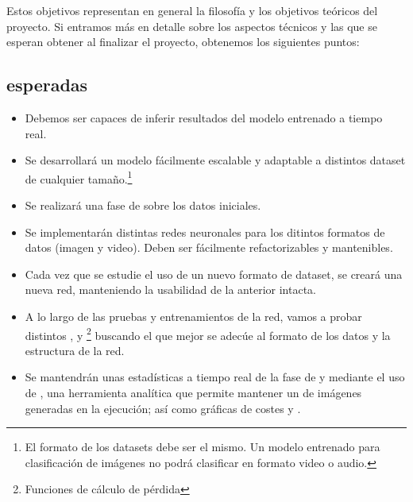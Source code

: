 Estos objetivos representan en general la filosofía y los objetivos teóricos del proyecto. Si entramos más en detalle sobre los aspectos técnicos y las  que se esperan obtener al finalizar el proyecto, obtenemos los siguientes puntos:

\subsection{ esperadas}

\begin{itemize}
  \item Debemos ser capaces de inferir resultados del modelo entrenado a tiempo real.
  \item Se desarrollará un modelo fácilmente escalable y adaptable a distintos dataset de cualquier tamaño.\footnote{El formato de los datasets debe ser el mismo. Un modelo entrenado para clasificación de imágenes no podrá clasificar en formato video o audio.}
  \item Se realizará una fase de  sobre los datos iniciales.
  \item Se implementarán distintas redes neuronales para los ditintos formatos de datos (imagen y video). Deben ser fácilmente refactorizables y mantenibles.
  \item Cada vez que se estudie el uso de un nuevo formato de dataset, se creará una nueva red, manteniendo la usabilidad de la anterior intacta.
  \item A lo largo de las pruebas y entrenamientos de la red, vamos a probar distintos ,  y \footnote{Funciones de cálculo de pérdida} buscando el que mejor se adecúe al formato de los datos y la estructura de la red.
  \item Se mantendrán unas estadísticas a tiempo real de la fase de  y  mediante el uso de , una herramienta analítica que permite mantener un  de imágenes generadas en la ejecución; así como gráficas de costes y .
\end{itemize}
